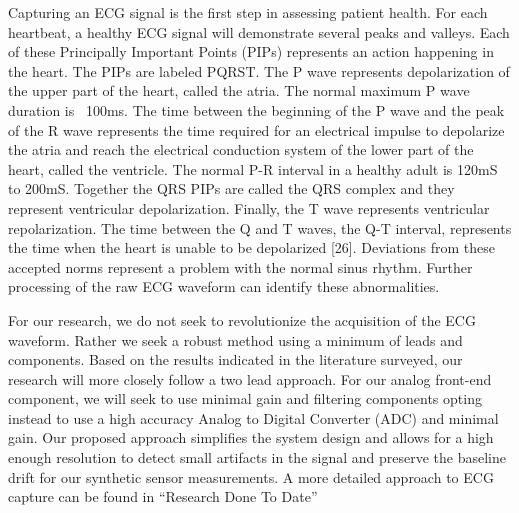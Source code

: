 Capturing an ECG signal is the first step in assessing patient health. For each heartbeat, a healthy ECG signal will demonstrate several peaks and valleys. Each of these Principally Important Points (PIPs) represents an action happening in the heart. The PIPs are labeled PQRST. The P wave represents depolarization of the upper part of the heart, called the atria. The normal maximum P wave duration is ~100ms. The time between the beginning of the P wave and the peak of the R wave represents the time required for an electrical impulse to depolarize the atria and reach the electrical conduction system of the lower part of the heart, called the ventricle. The normal P-R interval in a healthy adult is 120mS to 200mS. Together the QRS PIPs are called the QRS complex and they represent ventricular depolarization. Finally, the T wave represents ventricular repolarization. The time between the Q and T waves, the Q-T interval, represents the time when the heart is unable to be depolarized [26]. Deviations from these accepted norms represent a problem with the normal sinus rhythm. Further processing of the raw ECG waveform can identify these abnormalities.

For our research, we do not seek to revolutionize the acquisition of the ECG waveform. Rather we seek a robust method using a minimum of leads and components. Based on the results indicated in the literature surveyed, our research will more closely follow a two lead approach. For our analog front-end component, we will seek to use minimal gain and filtering components opting instead to use a high accuracy Analog to Digital Converter (ADC) and minimal gain. Our proposed approach simplifies the system design and allows for a high enough resolution to detect small artifacts in the signal and preserve the baseline drift for our synthetic sensor measurements. A more detailed approach to ECG capture can be found in “Research Done To Date”


